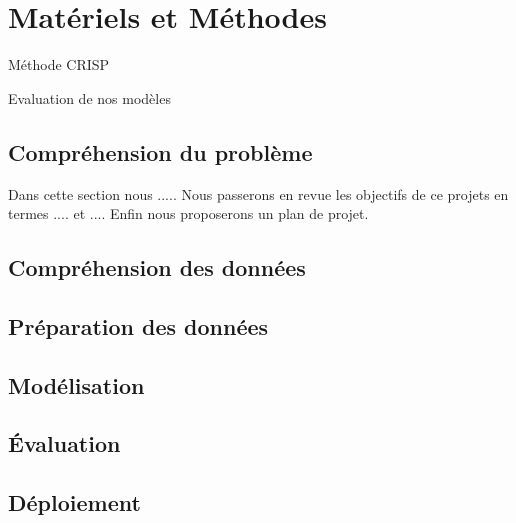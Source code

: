 \chapter{Matériels et Méthodes}

Méthode CRISP\cite{crisp}

Evaluation de nos modèles \cite{plasticc_team_2019_2539456}

\section{Compréhension du problème}

Dans cette section nous .....
Nous passerons en revue les objectifs de ce projets en termes .... et ....
Enfin nous proposerons un plan de projet.


\section{Compréhension des données}
\section{Préparation des données}
\section{Modélisation}



\section{Évaluation}
\section{Déploiement}